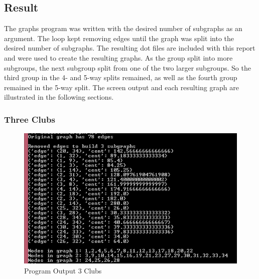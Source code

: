 \documentclass[paper=a4, fontsize=11pt]{scrartcl} %
\numberwithin{equation}{section} %
\numberwithin{figure}{section} %
\numberwithin{table}{section} %
\begin{document}
\subsection{Result}
The graphs program was written with the desired number of subgraphs as an argument.
The loop kept removing edges until the graph was split into the desired number of subgraphs.
The resulting dot files are included with this report and were used to create the resulting graphs.
As the group split into more subgroups, the next subgroup split from one of the two larger subgroups.
So the third group in the 4- and 5-way splits remained, as well as the fourth group remained in the 5-way split.
The screen output and each resulting graph are illustrated in the following sections.

\subsubsection{Three Clubs}
\begin{figure}[H]
\includegraphics[width=1\textwidth]{3clubs/output}
\caption{Program Output 3 Clubs}
\label{fig:output3}
\end{figure}
\end{document}
